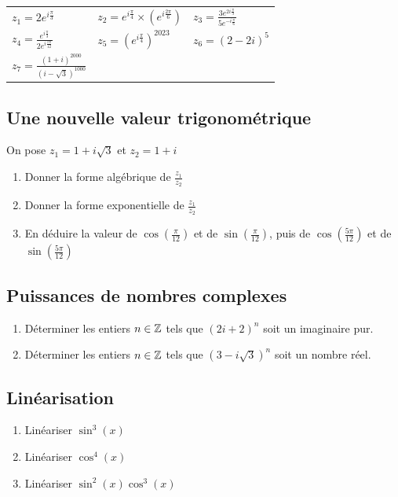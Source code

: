 \documentclass[oneside,12pt]{book}          %
\begin{document}
\begin{tabular}{p{} p{} p{}}
    $z_1=2e^{i\frac{\pi}{3}}$ & $z_2=e^{i\frac{\pi}{4}}\times (e^{i\frac{2\pi}{6}})$ & $z_3=\frac{3e^{2i\frac{\pi}{3}}}{5e^{-i\frac{\pi}{6}}}$ \\
    $z_4=\frac{e^{i\frac{\pi}{3}}}{2e^{i\frac{7\pi}{12}}}$ & $z_5=\left(e^{i\frac{\pi}{4}}\right)^{2023}$ & $z_6 = (2-2i)^5$ \\
    $z_7=\frac{(1+i)^{2000}}{(i-\sqrt{3})^{1000}}$
\end{tabular}



\subsection{Une nouvelle valeur trigonométrique}
On pose $z_1=1+i\sqrt{3}$ et $z_2=1+i$
\begin{enumerate}
    \item Donner la forme algébrique de $\frac{z_1}{z_2}$
    \item Donner la forme exponentielle de $\frac{z_1}{z_2}$
    \item En déduire la valeur de $\cos(\frac{\pi}{12})$ et de $\sin(\frac{\pi}{12})$, puis de $\cos(\frac{5\pi}{12})$ et de $\sin(\frac{5\pi}{12})$
\end{enumerate}



\subsection{Puissances de nombres complexes}
\begin{enumerate}
    \item Déterminer les entiers $n\in{\mathbb Z}$ tels que $(2i+2)^n$ soit un imaginaire pur.
	\item Déterminer les entiers $n\in{\mathbb Z}$ tels que $(3-i\sqrt{3})^n$ soit un nombre réel.
\end{enumerate}



\subsection{Linéarisation}
\begin{enumerate}
	\item Linéariser $\sin^3(x)$
	\item Linéariser $\cos^4(x)$
	\item Linéariser $\sin^2(x)\cos^3(x)$
\end{enumerate}
\end{document}
